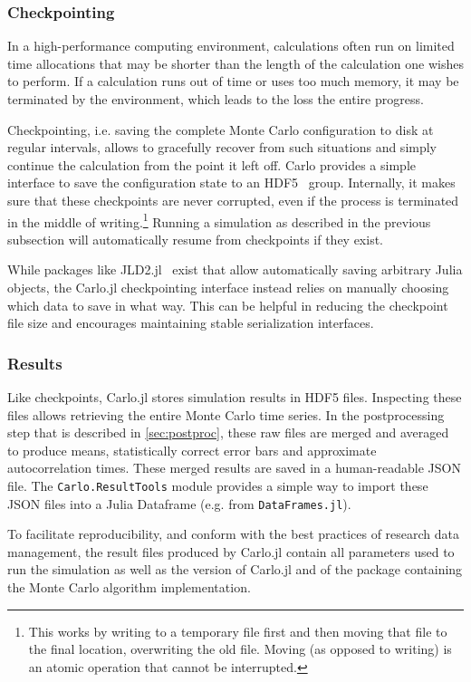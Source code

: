 \documentclass{SciPost}
\begin{document}
\subsubsection{Checkpointing}
In a high-performance computing environment, calculations often run on limited time allocations that may be shorter than the length of the calculation one wishes to perform. If a calculation runs out of time or uses too much memory, it may be terminated by the environment, which leads to the loss the entire progress.

Checkpointing, i.e. saving the complete Monte Carlo configuration to disk at regular intervals, allows to gracefully recover from such situations and simply continue the calculation from the point it left off. Carlo provides a simple interface to save the configuration state to an HDF5~\cite{HDF5, HDF5jl} group. Internally, it makes sure that these checkpoints are never corrupted, even if the process is terminated in the middle of writing.\footnote{This works by writing to a temporary file first and then moving that file to the final location, overwriting the old file. Moving (as opposed to writing) is an atomic operation that cannot be interrupted.} Running a simulation as described in the previous subsection will automatically resume from checkpoints if they exist.

While packages like JLD2.jl~\cite{JLD2} exist that allow automatically saving arbitrary Julia objects, the Carlo.jl checkpointing interface instead relies on manually choosing which data to save in what way. This can be helpful in reducing the checkpoint file size and encourages maintaining stable serialization interfaces.
\subsubsection{Results}
Like checkpoints, Carlo.jl stores simulation results in HDF5 files. Inspecting these files allows retrieving the entire Monte Carlo time series. In the postprocessing step that is described in \cref{sec:postproc}, these raw files are merged and averaged to produce means, statistically correct error bars and approximate autocorrelation times. These merged results are saved in a human-readable JSON file. The \texttt{Carlo.ResultTools} module provides a simple way to import these JSON files into a Julia Dataframe (e.g. from \texttt{DataFrames.jl}\cite{BouchetValat2023}).

To facilitate reproducibility, and conform with the best practices of research data management, the result files produced by Carlo.jl contain all parameters used to run the simulation as well as the version of Carlo.jl and of the package containing the Monte Carlo algorithm implementation.
\end{document}
